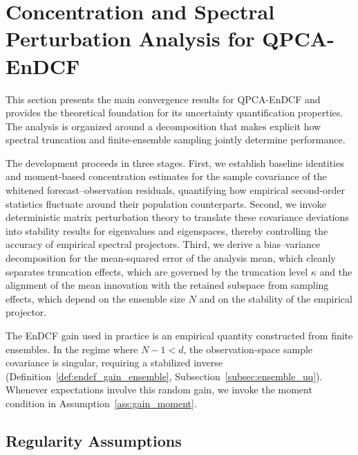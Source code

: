 \documentclass[11pt,a4paper]{article}
\begin{document}
\FloatBarrier


\section{Concentration and Spectral Perturbation Analysis for QPCA-EnDCF}
\label{sec:concentration_spectral}

This section presents the main convergence results for QPCA-EnDCF and provides the theoretical foundation for its uncertainty quantification properties. The analysis is organized around a decomposition that makes explicit how spectral truncation and finite-ensemble sampling jointly determine performance.

The development proceeds in three stages. First, we establish baseline identities and moment-based concentration estimates for the sample covariance of the whitened forecast--observation residuals, quantifying how empirical second-order statistics fluctuate around their population counterparts. Second, we invoke deterministic matrix perturbation theory to translate these covariance deviations into stability results for eigenvalues and eigenspaces, thereby controlling the accuracy of empirical spectral projectors. Third, we derive a bias--variance decomposition for the mean-squared error of the analysis mean, which cleanly separates truncation effects, which are governed by the truncation level $\kappa$ and the alignment of the mean innovation with the retained subspace from sampling effects, which depend on the ensemble size $N$ and on the stability of the empirical projector.

The EnDCF gain used in practice is an empirical quantity constructed from finite ensembles. In the regime where $N-1<d$, the observation-space sample covariance is singular, requiring a stabilized inverse (Definition~\ref{def:endcf_gain_ensemble}, Subsection~\ref{subsec:ensemble_uq}). Whenever expectations involve this random gain, we invoke the moment condition in Assumption~\ref{ass:gain_moment}.





\subsection{Regularity Assumptions}
\label{subsec:regularity_assumptions}
\end{document}
